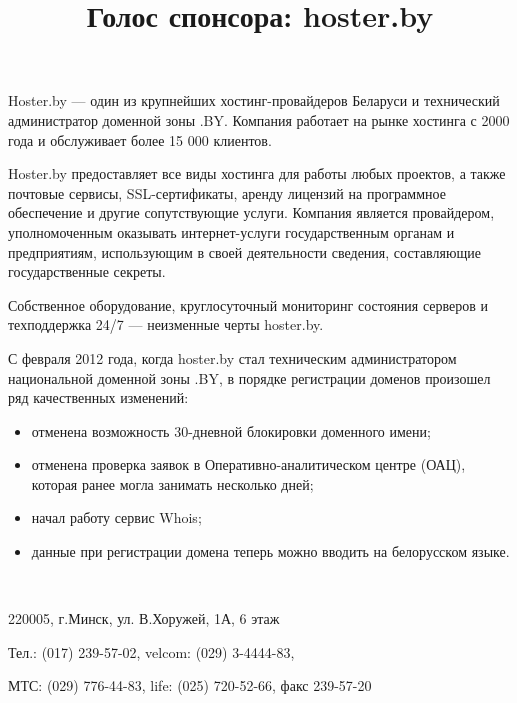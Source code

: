 \documentclass[10pt, a5paper]{article}
\begin{document}
\title{Голос спонсора: hoster.by}
\date{}
\maketitle%

Hoster.by --- один из крупнейших хостинг-провайдеров Беларуси и технический администратор доменной зоны .BY. Компания работает на рынке хостинга с 2000 года и обслуживает более 15 000 клиентов. 

Hoster.by предоставляет все виды хостинга для работы любых проектов, а также почтовые сервисы, SSL-сертификаты, аренду лицензий на программное обеспечение и другие сопутствующие услуги. Компания является провайдером, уполномоченным оказывать интернет-услуги государственным органам и предприятиям, использующим в своей деятельности сведения, составляющие государственные секреты.

Собственное оборудование, круглосуточный мониторинг состояния серверов и техподдержка 24/7 --- неизменные черты hoster.by.

С февраля 2012 года, когда hoster.by стал техническим администратором национальной доменной зоны .BY, в порядке регистрации доменов произошел ряд качественных изменений:

\begin{itemize}
\item отменена возможность 30-дневной блокировки доменного имени;
\item отменена проверка заявок в Оперативно-аналитическом центре (ОАЦ), которая ранее могла занимать несколько дней;
\item начал работу сервис Whois;
\item данные при регистрации домена теперь можно вводить на белорусском языке.
\end{itemize}

~

\begin{flushright}
220005, г.Минск, ул. В.Хоружей, 1А, 6 этаж 

Тел.: (017) 239-57-02, velcom: (029) 3-4444-83, 

МТС: (029) 776-44-83, life: (025) 720-52-66, факс 239-57-20
\end{flushright}
\end{document}
